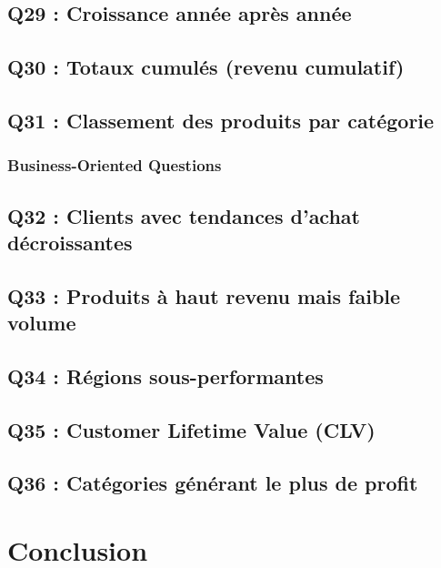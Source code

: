 \documentclass{RapportINPTCLOUD}
\begin{document}

\subsection{Q29 : Croissance ann\'{e}e apr\`{e}s ann\'{e}e}


\subsection{Q30 : Totaux cumul\'{e}s (revenu cumulatif)}


\subsection{Q31 : Classement des produits par cat\'{e}gorie}


\subsubsection*{Business-Oriented Questions}

\subsection{Q32 : Clients avec tendances d'achat d\'{e}croissantes}


\subsection{Q33 : Produits \`{a} haut revenu mais faible volume}


\subsection{Q34 : R\'{e}gions sous-performantes}


\subsection{Q35 : Customer Lifetime Value (CLV)}


\subsection{Q36 : Cat\'{e}gories g\'{e}n\'{e}rant le plus de profit}


\section{Conclusion}

\end{document}
